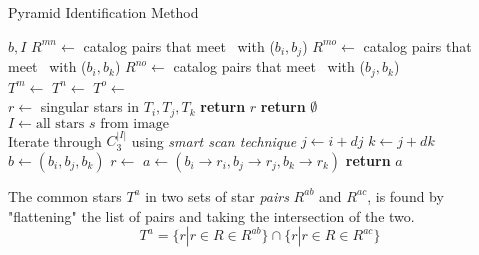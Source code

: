 \begin{algorithm}
    \caption{Pyramid Identification Method} \label{algorithm:pyramidIdentification}
    \begin{algorithmic}[1]
         {$b, I$}
        \State $R^{mn} \gets$ catalog pairs that meet~ with ($b_i, b_j$)
        \State $R^{mo} \gets$ catalog pairs that meet~ with ($b_i, b_k$)
        \State $R^{no} \gets$ catalog pairs that meet~ with ($b_j, b_k$)
        \\
        \State $T^m \gets $ 
        \State $T^n \gets $ 
        \State $T^o \gets $ 
        \\
        \State $r \gets $ singular stars in $T_i, T_j, T_k$
        \State \textbf{return} $r$
        \EndIf
        \EndIf
        \State \textbf{return} $\emptyset$
        \EndFunction
        \\
        \State $I \gets \text{all stars } s \text{ from image}$
        \\
        \LineComment Iterate through $C^{|I|}_3$ using \textit{smart scan technique}
        \State $j \gets i + dj$
        \State $k \gets j + dk$
        \\
        \State $b \gets (b_i, b_j, b_k)$
        \State $r \gets$ 
        \State $a \gets (b_i \rightarrow r_i, b_j \rightarrow r_j, b_k \rightarrow r_k)$
        \State \textbf{return} $a$
        \EndIf
        \EndFor
        \EndFor
        \EndFor
        \EndProcedure
    \end{algorithmic}
\end{algorithm}

The common stars $T^a$ in two sets of star \textit{pairs} $R^{ab}$ and $R^{ac}$, is found by "flattening" the list of
pairs and taking the intersection of the two.
\begin{equation}
    \label{eq:commonStarsPyramid}
    T^a = \{ r | r \in R \in R^{ab} \} \cap \{ r | r \in R \in R^{ac} \}
\end{equation}

